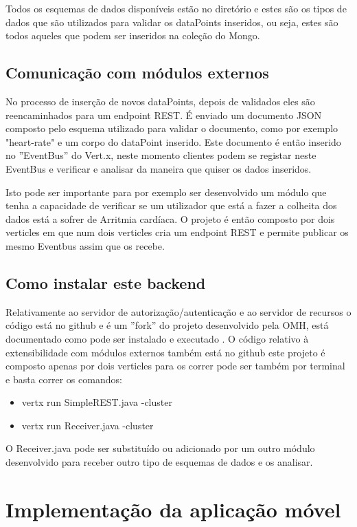 Todos os esquemas de dados disponíveis estão no diretório \cite{schemas-available} e estes são os tipos de dados que são utilizados para validar os dataPoints inseridos, ou seja, estes são todos aqueles que podem ser inseridos na coleção do Mongo.

\subsection{Comunicação com módulos externos}
No processo de inserção de novos dataPoints, depois de validados eles são reencaminhados para um endpoint \gls{REST}. É enviado um documento \gls{JSON} composto pelo esquema utilizado para validar o documento, como por exemplo "heart-rate" e um corpo do dataPoint inserido. Este documento é então inserido no ''EventBus'' do Vert.x, neste momento clientes podem se registar neste EventBus e verificar e analisar da maneira que quiser os dados inseridos. \par
Isto pode ser importante para por exemplo ser desenvolvido um módulo que tenha a capacidade de verificar se um utilizador que está a fazer a colheita dos dados está a sofrer de Arritmia cardíaca.
O projeto é então composto por dois verticles em que num dois verticles cria um endpoint \gls{REST} e permite publicar os mesmo Eventbus assim que os recebe.

\subsection{Como instalar este backend}
Relativamente ao servidor de autorização/autenticação e ao servidor de recursos o código está no github \cite{omh-code} e é um ''fork'' do projeto desenvolvido pela \gls{OMH}, está documentado como pode ser instalado e executado \cite{omh-runnatively}.
O código relativo à extensibilidade com módulos externos também está no github\cite{restpubsub} este projeto é composto apenas por dois verticles para os correr pode ser também por terminal e basta correr os comandos:
\begin{itemize}
    \item vertx run SimpleREST.java -cluster
    \item vertx run Receiver.java -cluster
\end{itemize}
O Receiver.java pode ser substituído ou adicionado por um outro módulo desenvolvido para receber outro tipo de esquemas de dados e os analisar.

\section{Implementação da aplicação móvel}
